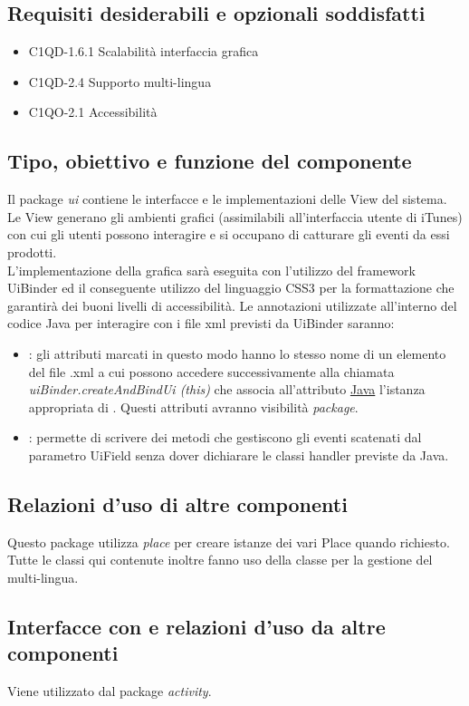 \subsection*{Requisiti desiderabili e opzionali soddisfatti}
\begin{itemize}
    \item C1QD-1.6.1 Scalabilit\`a interfaccia grafica
    \item C1QD-2.4 Supporto multi-lingua
    \item C1QO-2.1 Accessibilit\`a
\end{itemize}
\subsection*{Tipo, obiettivo e funzione del componente}
Il package \emph{ui} contiene le interfacce e le implementazioni delle View del
sistema. Le View generano gli ambienti grafici (assimilabili all'interfaccia
utente di iTunes) con cui gli utenti possono interagire e si occupano di
catturare gli eventi da essi prodotti. \\
L'implementazione della grafica sar\`a eseguita con l'utilizzo del framework
UiBinder ed il conseguente utilizzo del linguaggio CSS3 per la formattazione
che garantir\`a dei buoni livelli di accessibilit\`a.
Le annotazioni utilizzate all'interno del codice Java per interagire con i file
xml previsti da UiBinder saranno:
\begin{itemize}
  \item {}: gli attributi marcati in questo modo hanno lo stesso nome
  di un elemento del file .xml a cui possono accedere successivamente alla
  chiamata \emph{uiBinder.createAndBindUi (this)} che associa all'attributo
  \underline{Java} l'istanza appropriata di . Questi attributi
  avranno visibilit\`a \emph{package}.
  \item {}: permette di scrivere dei metodi
  che gestiscono gli eventi scatenati dal parametro UiField senza
  dover dichiarare le classi handler previste da Java.
\end{itemize}  
\subsection*{Relazioni
d'uso di altre componenti} Questo package utilizza \emph{place} per creare istanze dei vari Place quando richiesto.
Tutte le classi qui contenute inoltre fanno uso della classe 
per la gestione del multi-lingua. 
\subsection*{Interfacce con e relazioni d'uso
da altre componenti} Viene utilizzato dal package \emph{activity}.
